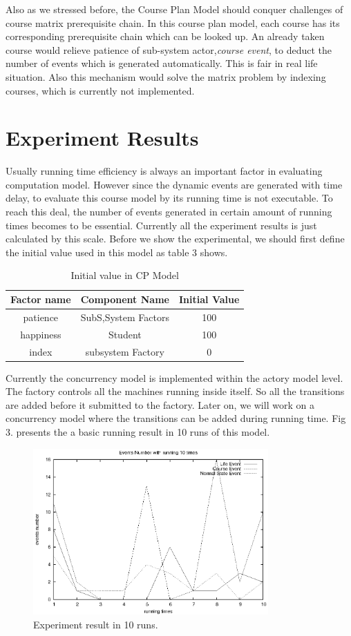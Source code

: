 \documentclass{sig-alternate}
\begin{document}
Also as we stressed before, the Course Plan Model should conquer challenges of course matrix prerequisite chain.  In this course plan model,  each course has its corresponding prerequisite chain which can be looked up. An already taken course would relieve patience of sub-system actor,{\em course event}, to deduct the number of events which is generated automatically.  This is fair in real life situation.  Also this mechanism would solve the matrix problem by indexing courses, which is currently not implemented. \\ 

\section{Experiment Results}
Usually running time efficiency is always an important factor in evaluating computation model. However since the dynamic events are generated with time delay, to evaluate this course model by its running time is not executable.  To reach this deal, the number of events generated in certain amount of running times becomes to be essential.   Currently all the experiment results is just calculated by this scale.  Before we show the experimental, we should first define the initial value used in this model as table 3 shows.
\begin{table}[h]
\centering
\caption{Initial value in CP Model }
\begin{tabular}{|c|c|c|}\hline
Factor name & Component Name & Initial Value \\
\hline
patience & SubS,System Factors & 100\\
\hline
happiness & Student &100\\
\hline
index & subsystem Factory &0\\
\hline
\end{tabular}
\end{table}

Currently the concurrency model is implemented within the actory model level. The factory controls all the machines running inside itself.  So all the transitions are added before it submitted to the factory. Later on, we will work on a concurrency model where the transitions can be added during running time.  Fig 3. presents the a basic running result in 10 runs of this model.  
\begin{figure}[!h]
\centering
\includegraphics[width=90mm ]{stat}
\caption{Experiment result in 10 runs.}
\end{figure}
\end{document}
